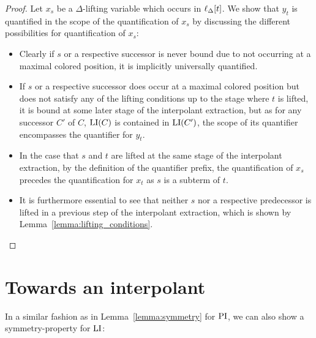 \begin{proof}
	Let $x_s$ be a $\Delta$-lifting variable which occurs in $\ell_{\Delta}[t]$. 
	We show that $y_t$ is quantified in the scope of the quantification of $x_s$ by discussing the different possibilities for quantification of $x_s$:

	\begin{itemize}
		\item
			Clearly if $s$ or a respective successor is never bound due to not occurring at a maximal colored position, it is implicitly universally quantified.

		\item
			If $s$ or a respective successor does occur at a maximal colored position but does not satisfy any of the lifting conditions up to the stage where $t$ is lifted, it is bound at some later stage of the interpolant extraction, but as for any successor $C'$ of $C$, $\operatorname{LI}(C)$ is contained in $\operatorname{LI}(C')$, 
			the scope of its quantifier encompasses the quantifier for $y_t$.

		\item
			In the case that $s$ and $t$ are lifted at the same stage of the interpolant extraction, by the definition of the quantifier prefix, the quantification of $x_s$ precedes the quantification for $x_t$ as $s$ is a subterm of $t$.


		\item
			It is furthermore essential to see that neither $s$ nor a respective predecessor is lifted in a previous step of the interpolant extraction, which is shown by Lemma~\ref{lemma:lifting_conditions}.
			\qedhere
	\end{itemize}
\end{proof}

\section{Towards an interpolant}

In a similar fashion as in Lemma~\ref{lemma:symmetry} for $\operatorname{PI}$, we can also show a symmetry-property for $\operatorname{LI}$:

